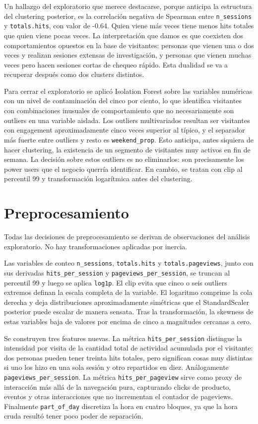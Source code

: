 \documentclass[11pt,a4paper]{article}
\begin{document}
Un hallazgo del exploratorio que merece destacarse, porque anticipa la
estructura del clustering posterior, es la correlación negativa de Spearman
entre \texttt{n\_sessions} y \texttt{totals.hits}, con valor de -0.64. Quien
viene más veces tiene menos hits totales que quien viene pocas veces. La
interpretación que damos es que coexisten dos comportamientos opuestos en la
base de visitantes: personas que vienen una o dos veces y realizan sesiones
extensas de investigación, y personas que vienen muchas veces pero hacen
sesiones cortas de chequeo rápido. Esta dualidad se va a recuperar después como
dos clusters distintos.

Para cerrar el exploratorio se aplicó Isolation Forest sobre las variables
numéricas con un nivel de contaminación del cinco por ciento, lo que identifica
visitantes con combinaciones inusuales de comportamiento que no necesariamente
son outliers en una variable aislada. Los outliers multivariados resultan ser
visitantes con engagement aproximadamente cinco veces superior al típico, y el
separador más fuerte entre outliers y resto es \texttt{weekend\_prop}. Esto
anticipa, antes siquiera de hacer clustering, la existencia de un segmento de
visitantes muy activos en fin de semana. La decisión sobre estos outliers es no
eliminarlos: son precisamente los power users que el negocio querría identificar.
En cambio, se tratan con clip al percentil 99 y transformación logarítmica antes
del clustering.

\section{Preprocesamiento}

Todas las decisiones de preprocesamiento se derivan de observaciones del
análisis exploratorio. No hay transformaciones aplicadas por inercia.

Las variables de conteo \texttt{n\_sessions}, \texttt{totals.hits} y
\texttt{totals.pageviews}, junto con sus derivadas \texttt{hits\_per\_session} y
\texttt{pageviews\_per\_session}, se truncan al percentil 99 y luego se aplica
\texttt{log1p}. El clip evita que cinco o seis outliers extremos definan la
escala completa de la variable. El logaritmo comprime la cola derecha y deja
distribuciones aproximadamente simétricas que el StandardScaler posterior puede
escalar de manera sensata. Tras la transformación, la skewness de estas
variables baja de valores por encima de cinco a magnitudes cercanas a cero.

Se construyen tres features nuevas. La métrica \texttt{hits\_per\_session}
distingue la intensidad por visita de la cantidad total de actividad acumulada
por el visitante: dos personas pueden tener treinta hits totales, pero significan
cosas muy distintas si uno los hizo en una sola sesión y otro repartidos en
diez. Análogamente \texttt{pageviews\_per\_session}. La métrica
\texttt{hits\_per\_pageview} sirve como proxy de interacción más allá de la
navegación pura, capturando clicks de producto, eventos y otras interacciones
que no incrementan el contador de pageviews. Finalmente \texttt{part\_of\_day}
discretiza la hora en cuatro bloques, ya que la hora cruda resultó tener poco
poder de separación.
\end{document}
